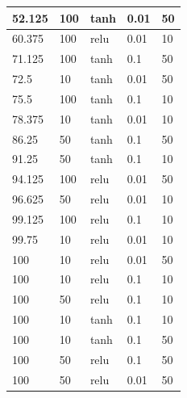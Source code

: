 \begin{enumerate}
\begin{enumerate}
\begin{enumerate}
\begin{enumerate}
\begin{center}
\begin{tabular}{|l|l|l|l|l|}
		52.125   & 100         & tanh           & 0.01                 & 50                   \\ \hline
		60.375   & 100         & relu           & 0.01                 & 10                   \\ \hline
		71.125   & 100         & tanh           & 0.1                  & 50                   \\ \hline
		72.5     & 10          & tanh           & 0.01                 & 50                   \\ \hline
		75.5     & 100         & tanh           & 0.1                  & 10                   \\ \hline
		78.375   & 10          & tanh           & 0.01                 & 10                   \\ \hline
		86.25    & 50          & tanh           & 0.1                  & 50                   \\ \hline
		91.25    & 50          & tanh           & 0.1                  & 10                   \\ \hline
		94.125   & 100         & relu           & 0.01                 & 50                   \\ \hline
		96.625   & 50          & relu           & 0.01                 & 10                   \\ \hline
		99.125   & 100         & relu           & 0.1                  & 10                   \\ \hline
		99.75    & 10          & relu           & 0.01                 & 10                   \\ \hline
		100      & 10          & relu           & 0.01                 & 50                   \\ \hline
		100      & 10          & relu           & 0.1                  & 10                   \\ \hline
		100      & 50          & relu           & 0.1                  & 10                   \\ \hline
		100      & 10          & tanh           & 0.1                  & 10                   \\ \hline
		100      & 10          & tanh           & 0.1                  & 50                   \\ \hline
		100      & 50          & relu           & 0.1                  & 50                   \\ \hline
		100      & 50          & relu           & 0.01                 & 50                   \\ \hline

\end{tabular}
\end{center}
\end{enumerate}
\end{enumerate}
\end{enumerate}
\end{enumerate}
